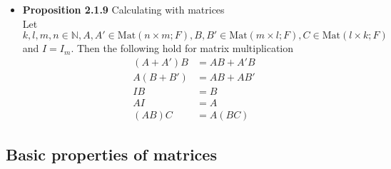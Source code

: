 \documentclass[11pt,a4paper]{article}
\begin{document}
\begin{itemize}
    \item \textbf{Proposition 2.1.9} Calculating with matrices \\
        Let $k, l, m, n \in \mathbb{N}, A, A' \in \mathrm{Mat}(n \times m;F),
        B, B' \in \mathrm{Mat}(m \times l;F), C \in \mathrm{Mat}(l \times k; F)$ and $I = I_m$.
        Then the following hold for matrix multiplication
        \begin{align*}{}
            (A + A')B & = AB + A'B \\
            A(B + B') & = AB + AB' \\
            IB        & = B \\
            AI        & = A \\
            (AB)C     & = A(BC)
        \end{align*}

\end{itemize}

\subsection{Basic properties of matrices}
\end{document}
